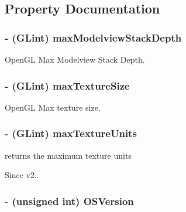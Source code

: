 \subsection{Property Documentation}
\hypertarget{interface_c_c_configuration_a7c7b06ab48d5f5e55aff3681aa77ab91}{
\subsubsection[{max\-Modelview\-Stack\-Depth}]{\setlength{\rightskip}{0pt plus 5cm}-\/ (G\-Lint) {\bf max\-Modelview\-Stack\-Depth}}}\label{interface_c_c_configuration_a7c7b06ab48d5f5e55aff3681aa77ab91}
Open\-G\-L Max Modelview Stack Depth. \hypertarget{interface_c_c_configuration_a247ddc51eeee101083716888f52c1ccb}{
\subsubsection[{max\-Texture\-Size}]{\setlength{\rightskip}{0pt plus 5cm}-\/ (G\-Lint) {\bf max\-Texture\-Size}}}\label{interface_c_c_configuration_a247ddc51eeee101083716888f52c1ccb}
Open\-G\-L Max texture size. \hypertarget{interface_c_c_configuration_a1fab22b6a96c7b4b85e120df26291612}{
\subsubsection[{max\-Texture\-Units}]{\setlength{\rightskip}{0pt plus 5cm}-\/ (G\-Lint) {\bf max\-Texture\-Units}}}\label{interface_c_c_configuration_a1fab22b6a96c7b4b85e120df26291612}
returns the maximum texture units \begin{DoxySince}{Since}
v2.. 
\end{DoxySince}
\hypertarget{interface_c_c_configuration_a702f8067990021f6ad4366c8ea8033f4}{
\subsubsection[{O\-S\-Version}]{\setlength{\rightskip}{0pt plus 5cm}-\/ (unsigned int) {\bf O\-S\-Version}}}\label{interface_c_c_configuration_a702f8067990021f6ad4366c8ea8033f4}
